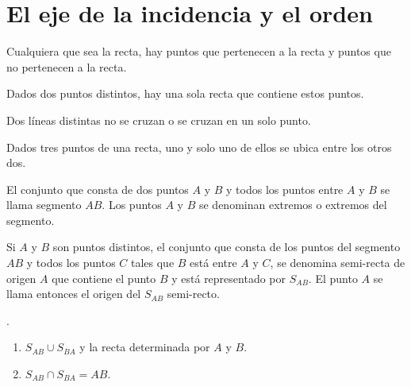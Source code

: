 \chapter{El eje de la incidencia y el orden}

\begin{axioma}
    Cualquiera que sea la recta, hay puntos que pertenecen a la recta y puntos que no pertenecen a la recta.\\
\end{axioma}

\begin{axioma}
    Dados dos puntos distintos, hay una sola recta que contiene estos puntos.\\
\end{axioma}

	\begin{proposicion}
	    Dos líneas distintas no se cruzan o se cruzan en un solo punto.\\
	\end{proposicion}

\setcounter{part}{2}
\begin{axioma}
   Dados tres puntos de una recta, uno y solo uno de ellos se ubica entre los otros dos.\\
\end{axioma}

    \begin{def.}
	El conjunto que consta de dos puntos $A$ y $B$ y todos los puntos entre $A$ y $B$ se llama segmento $AB$. Los puntos $A$ y $B$ se denominan extremos o extremos del segmento.\\
    \end{def.}

    \begin{def.}
	Si $A$ y $B$ son puntos distintos, el conjunto que consta de los puntos del segmento $AB$ y todos los puntos $C$ tales que $B$ está entre $A$ y $C$, se denomina semi-recta de origen $A$ que contiene el punto $B$ y está representado por $S_{AB}$. El punto $A$ se llama entonces el origen del $S_{AB}$ semi-recto.\\
    \end{def.}

	\begin{proposicion}.\\
	    \begin{enumerate}[\bfseries a)] 
		\item $S_{AB} \cup S_{BA}$ y la recta determinada por $A$ y $B$.
		\item $S_{AB} \cap S_{BA} = AB$.\\
	    \end{enumerate}
	\end{proposicion}

